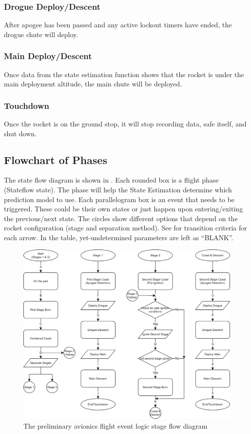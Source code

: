 \subsubsection*{Drogue Deploy/Descent}
After apogee has been passed and any active lockout timers have ended, the drogue chute will deploy.

\subsubsection*{Main Deploy/Descent}
Once data from the state estimation function shows that the rocket is under the main deployment altitude, the main chute will be deployed. 

\subsubsection*{Touchdown}
Once the rocket is on the ground stop, it will stop recording data, safe itself, and shut down.

\subsection*{Flowchart of Phases}
The state flow diagram is shown in . Each rounded box is a flight phase (Stateflow state). The phase will help the State Estimation determine which prediction model to use. Each parallelogram box is an event that needs to be triggered. These could be their own states or just happen upon entering/exiting the previous/next state. The circles show different options that depend on the rocket configuration (stage and separation method). See  for transition criteria for each arrow. In the table, yet-undetermined parameters are left as ``BLANK''.

\begin{figure}[htbp]
    \centering
    \includegraphics[width=\textwidth]{images/avionics-stateflow}
    \caption{The preliminary avionics flight event logic stage flow diagram}
    \label{figure:avionics-stateflow}
\end{figure}

